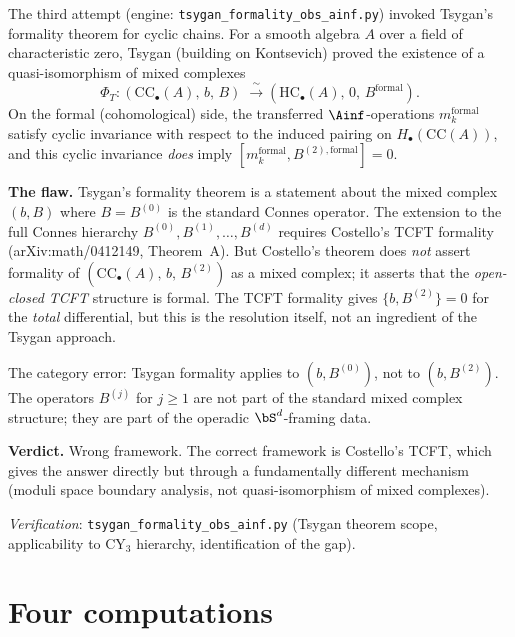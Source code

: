 \begin{remark}
\label{rem:wrong-proof-tsygan}
The third attempt (engine: \texttt{tsygan\_formality\_obs\_ainf.py})
invoked Tsygan's formality theorem for cyclic chains.  For a
smooth algebra $A$ over a field of characteristic zero, Tsygan
(building on Kontsevich) proved the existence of a
quasi-isomorphism of mixed complexes
\[
 \Phi_T \colon (\mathrm{CC}_\bullet(A),\, b,\, B)
 \;\xrightarrow{\;\sim\;}
 (\mathrm{HC}_\bullet(A),\, 0,\, B^{\mathrm{formal}}).
\]
On the formal (cohomological) side, the transferred
$\Ainf$-operations $m_k^{\mathrm{formal}}$ satisfy cyclic
invariance with respect to the induced pairing on
$H_\bullet(\mathrm{CC}(A))$, and this cyclic invariance
\emph{does} imply $[m_k^{\mathrm{formal}}, B^{(2),\mathrm{formal}}] = 0$.

\textbf{The flaw.}  Tsygan's formality theorem is a statement
about the mixed complex $(b, B)$ where $B = B^{(0)}$ is the
standard Connes operator.  The extension to the full Connes
hierarchy $B^{(0)}, B^{(1)}, \ldots, B^{(d)}$ requires Costello's
TCFT formality (arXiv:math/0412149, Theorem~A).  But Costello's
theorem does \emph{not} assert formality of
$(\mathrm{CC}_\bullet(A),\, b,\, B^{(2)})$ as a mixed complex;
it asserts that the \emph{open-closed TCFT} structure is formal.
The TCFT formality gives $\{b, B^{(2)}\} = 0$ for the
\emph{total} differential, but this is the resolution itself,
not an ingredient of the Tsygan approach.

The category error: Tsygan formality applies to
$(b, B^{(0)})$, not to $(b, B^{(2)})$.  The operators
$B^{(j)}$ for $j \geq 1$ are not part of the standard mixed
complex structure; they are part of the operadic
$\bS^d$-framing data.

\textbf{Verdict.}  Wrong framework.  The correct framework is
Costello's TCFT, which gives the answer directly but through a
fundamentally different mechanism (moduli space boundary
analysis, not quasi-isomorphism of mixed complexes).

\noindent\textit{Verification}: \texttt{tsygan\_formality\_obs\_ainf.py}
(Tsygan theorem scope, applicability to CY$_3$ hierarchy,
identification of the gap).
\end{remark}


\section{Four computations}
\label{sec:m3b2-computations}


